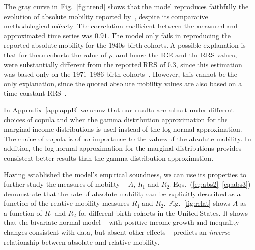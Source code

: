 \documentclass[12pt]{article}
\newcommand{\fref}[1]{Fig.~\ref{fig:#1}}
\numberwithin{equation}{section}
\begin{document}
The gray curve in~\fref{trend} shows that the model reproduces faithfully the evolution of absolute mobility reported by~\citet{chetty2017fading}, despite its comparative methodological na\"{i}vety. The correlation coefficient between the measured and approximated time series was $0.91$. The model only fails in reproducing the reported absolute mobility for the 1940s birth cohorts. A possible explanation is that for these cohorts the value of $\rho$, and hence the IGE and the RRS values, were substantially different from the reported RRS of $0.3$, since this estimation was based only on the $1971$--$1986$ birth cohorts~\citep{chetty2014united}. However, this cannot be the only explanation, since the quoted absolute mobility values are also based on a time-constant RRS~\citep{chetty2017fading}.

In Appendix~\ref{app:appB} we show that our results are robust under different choices of copula and when the gamma distribution approximation for the marginal income distributions is used instead of the log-normal approximation. The choice of copula is of no importance to the values of the absolute mobility. In addition, the log-normal approximation for the marginal distributions provides consistent better results than the gamma distribution approximation.


Having established the model's empirical soundness, we can use its properties to further study the measures of mobility -- $A$, $R_1$ and $R_2$. Eqs.~(\ref{eq:abs2}--\ref{eq:abs3}) demonstrate that the rate of absolute mobility can be explicitly described as a function of the relative mobility measures $R_1$ and $R_2$.~\fref{relat} shows $A$ as a function of $R_1$ and $R_2$ for different birth cohorts in the United States. It shows that the bivariate normal model -- with positive income growth and inequality changes consistent with data, but absent other effects -- predicts an \textit{inverse} relationship between absolute and relative mobility.
\end{document}
